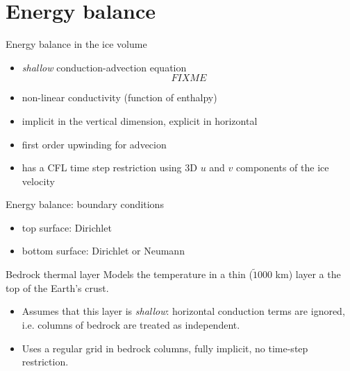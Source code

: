 \documentclass[notes,intlimits]{beamer}
\begin{document}
\section{Energy balance}
\label{sec:energy-balance}

\begin{frame}{Energy balance in the ice volume}
  \begin{itemize}
  \item \emph{shallow} conduction-advection equation
    \begin{equation}
      \label{eq:1}
      FIXME
    \end{equation}
  \item non-linear conductivity (function of enthalpy)
  \item implicit in the vertical dimension, explicit in horizontal
  \item first order upwinding for advecion
  \item has a CFL time step restriction using 3D $u$ and $v$
    components of the ice velocity
  \end{itemize}
\end{frame}


\begin{frame}{Energy balance: boundary conditions}
  \begin{itemize}
  \item top surface: Dirichlet
  \item bottom surface: Dirichlet or Neumann
  \end{itemize}
\end{frame}

\begin{frame}{Bedrock thermal layer}
  Models the temperature in a thin ($\tilde 1000$ km) layer a the top
  of the Earth's crust.

  \begin{itemize}
  \item Assumes that this layer is \emph{shallow}: horizontal
    conduction terms are ignored, i.e. columns of bedrock are treated
    as independent.
  \item Uses a regular grid in bedrock columns, fully implicit, no
    time-step restriction.
  \end{itemize}
\end{frame}
\end{document}
